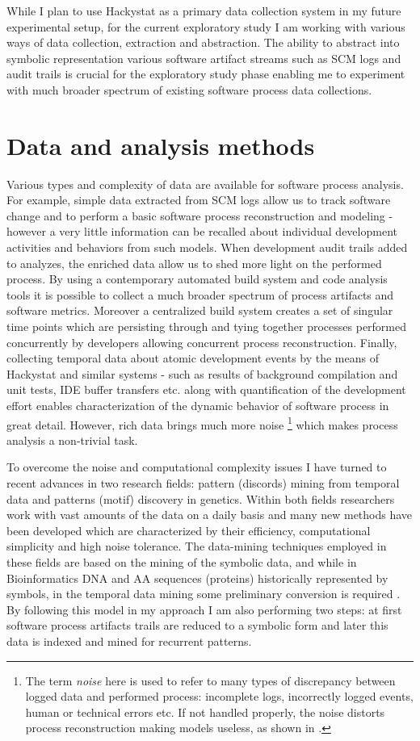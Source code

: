 \documentclass{sig-alternate}
\begin{document}
While I plan to use Hackystat as a primary data collection system in my future experimental setup, for the current exploratory study I am working with various ways of data collection, extraction and abstraction. The ability to abstract into symbolic representation various software artifact streams such as SCM logs and audit trails is crucial for the exploratory study phase enabling me to experiment with much broader spectrum of existing software process data collections.

\section{Data and analysis methods}
Various types and complexity of data are available for software process analysis. For example, simple data extracted from SCM logs allow us to track software change and to perform a basic software process reconstruction and modeling - however a very little information can be recalled about individual development activities and behaviors from such models. When development audit trails added to analyzes, the enriched data allow us to shed more light on the performed process. By using a contemporary automated build system and code analysis tools it is possible to collect a much broader spectrum of process artifacts and software metrics. Moreover a centralized build system creates a set of singular time points which are persisting through and tying together processes performed concurrently by developers allowing concurrent process reconstruction. Finally, collecting temporal data about atomic development events by the means of Hackystat and similar systems - such as results of background compilation and unit tests, IDE buffer transfers etc. along with quantification of the development effort enables characterization of the dynamic behavior of software process in great detail. However, rich data brings much more noise \footnote{The term \textit{noise} here is used to refer to many types of discrepancy between logged data and performed process: incomplete logs, incorrectly logged events, human or technical errors etc. If not handled properly, the noise distorts process reconstruction making models useless, as shown in \cite{citeulike:2678511}.} which makes process analysis a non-trivial task.  

To overcome the noise and computational complexity issues I have turned to recent advances in two research fields: pattern (discords) mining from temporal data and patterns (motif) discovery in genetics. Within both fields researchers work with vast amounts of the data on a daily basis and many new methods have been developed which are characterized by their efficiency, computational simplicity and high noise tolerance. The data-mining techniques employed in these fields are based on the mining of the symbolic data, and while in Bioinformatics DNA and AA sequences (proteins) historically represented by symbols, in the temporal data mining some preliminary conversion is required \cite{citeulike:2821475}. By following this model in my approach I am also performing two steps: at first software process artifacts trails are reduced to a symbolic form and later this data is indexed and mined for recurrent patterns.
\end{document}
